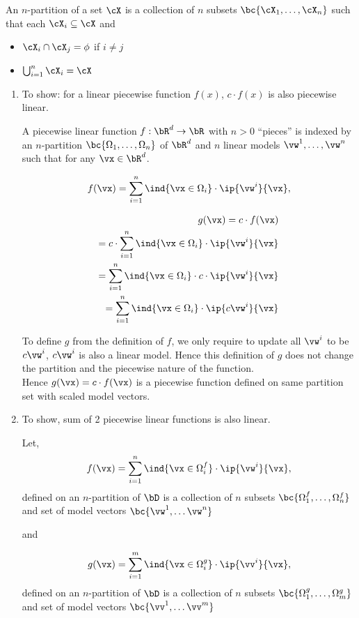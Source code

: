 \documentclass[a4paper,11pt]{article}
\begin{document}
\begin{mlsolution}
An $n$-partition of a set $\cX$ is a collection of $n$ subsets $\bc{\cX_1,\ldots,\cX_n}$ such that each $\cX_i \subseteq \cX$ and
\begin{itemize}
    \item $\cX_i \cap \cX_j = \phi$ if $i \neq j$
    \item $\bigcup_{i=1}^n \cX_i = \cX$
\end{itemize}

\begin{enumerate}
\item
To show: for a linear piecewise function $f(x)$, $c \cdot f(x)$ is also piecewise linear.\

A piecewise linear function $f: \bR^d \rightarrow \bR$ with $n > 0$ ``pieces'' is indexed by an $n$-partition $\bc{\Omega_1,\ldots,\Omega_n}$ of $\bR^d$ and $n$ linear models $\vw^1,\ldots,\vw^n$ such that for any $\vx \in \bR^d$.
 
\[f(\vx) = \sum_{i=1}^n \ind{\vx \in \Omega_i}\cdot\ip{\vw^i}{\vx},\]

\begin{align}
 g(\vx) = c \cdot f(\vx)\\
 = c \cdot \sum_{i=1}^n \ind{\vx \in \Omega_i}\cdot\ip{\vw^i}{\vx}\\
 = \sum_{i=1}^n \ind{\vx \in \Omega_i}\cdot c \cdot \ip{\vw^i}{\vx}\\
 = \sum_{i=1}^n \ind{\vx \in \Omega_i}\cdot \ip{c \vw^i}{\vx} 
\end{align}

To define $g$ from the definition of $f$, we only require to update all $\vw^i $ to be $c\vw^i$, $c\vw^i$ is also a linear model. Hence this definition of $g$ does not change the partition and the piecewise nature of the function.\\
Hence $g(\vx) = c \cdot f(\vx) $ is a piecewise function defined on same partition set with scaled model vectors.

\item
To show, sum of 2 piecewise linear functions is also linear.

Let,  
\[f(\vx) = \sum_{i=1}^n \ind{\vx \in \Omega_i^f}\cdot\ip{\vw^i}{\vx},\]
defined on an $n$-partition of $\bD $ is a collection of $n$ subsets $\bc{\Omega_1^f,\ldots,\Omega_n^f}$ and set of model vectors $\bc {\vw^1, \ldots \vw^n }$

and

\[g(\vx) = \sum_{i=1}^m \ind{\vx \in \Omega_i^g}\cdot\ip{\vv^i}{\vx},\]
defined on an $n$-partition of $\bD $ is a collection of $n$ subsets $\bc{\Omega_1^g,\ldots,\Omega_m^g}$ and set of model vectors $\bc {\vv^1, \ldots \vv^m }$


\end{enumerate}
\end{mlsolution}
\end{document}
